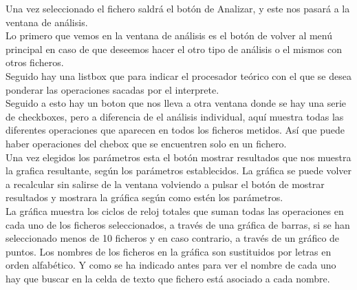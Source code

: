 
Una vez seleccionado el fichero saldrá el botón de Analizar, y este nos pasará a la ventana de análisis.\\
Lo primero que vemos en la ventana de análisis es el botón de volver al menú principal en caso de que deseemos hacer el otro tipo de análisis o el mismos con otros  ficheros.\\

Seguido hay una listbox que para indicar el procesador teórico con el que se desea ponderar  las operaciones sacadas por el interprete.\\

Seguido a esto hay un boton que nos lleva a otra ventana donde se hay una serie de checkboxes, pero a diferencia de el análisis individual, aquí muestra todas las diferentes operaciones que aparecen en todos los ficheros metidos. Así que puede haber operaciones del chebox que se encuentren solo en un fichero.\\

Una vez elegidos los parámetros esta el botón mostrar resultados que nos muestra la grafica resultante, según los parámetros establecidos. La gráfica se  puede volver a recalcular sin salirse de la ventana volviendo a  pulsar el botón de mostrar resultados y mostrara la gráfica según como estén los parámetros.\\
 
La gráfica muestra los ciclos de reloj totales que suman todas las operaciones en cada uno de los ficheros seleccionados, a través de una gráfica de barras, si se han seleccionado menos de 10 ficheros y en caso contrario, a través de un gráfico de puntos. Los nombres de los ficheros en la gráfica son sustituidos por letras en orden alfabético. Y como se ha indicado antes para ver el nombre de cada uno hay que buscar en la celda de texto que fichero está asociado a cada nombre.\\





